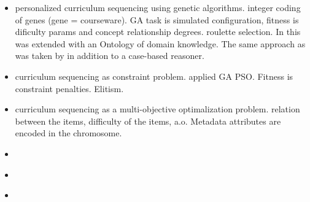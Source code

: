 
\begin{itemize}
	\item \citep{Chen2008} personalized curriculum sequencing using genetic
		algorithms. integer coding of genes (gene = courseware). GA task is
		simulated configuration, fitness is dificulty params and concept
		relationship degrees. roulette selection.  In \citep{Chen2009} this was
		extended with an Ontology of domain knowledge. The same approach as
		\citep{Chen2008} was taken by \citep{Huang2007} in addition to a
		case-based reasoner.
	\item \citep{deMarcos2009} curriculum sequencing as constraint problem. applied GA PSO. Fitness is constraint penalties. Elitism. 
	\item \citep{Seki2005} curriculum sequencing as a multi-objective
		optimalization problem. relation between the items, difficulty of the
		items, a.o. Metadata attributes are encoded in the chromosome.
	\item \citep{Samia2007}
	\item \citep{Hovakimyan2004}
	\item \citep{Huang2007}
\end{itemize}

